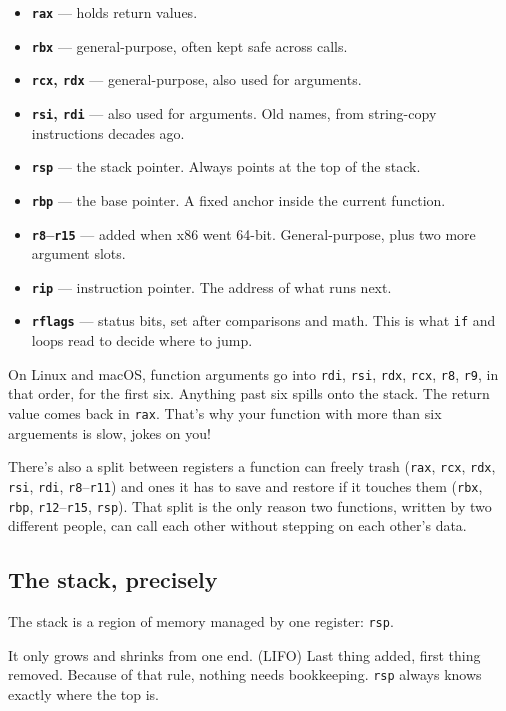 \documentclass[11pt,a4paper]{article}
\begin{document}
\begin{itemize}
\item \textbf{\texttt{rax}} --- holds return values.
\item \textbf{\texttt{rbx}} --- general-purpose, often kept safe across calls.
\item \textbf{\texttt{rcx}, \texttt{rdx}} --- general-purpose, also used for arguments.
\item \textbf{\texttt{rsi}, \texttt{rdi}} --- also used for arguments. Old names, from string-copy instructions decades ago.
\item \textbf{\texttt{rsp}} --- the stack pointer. Always points at the top of the stack.
\item \textbf{\texttt{rbp}} --- the base pointer. A fixed anchor inside the current function.
\item \textbf{\texttt{r8}--\texttt{r15}} --- added when x86 went 64-bit. General-purpose, plus two more argument slots.
\item \textbf{\texttt{rip}} --- instruction pointer. The address of what runs next.
\item \textbf{\texttt{rflags}} --- status bits, set after comparisons and math. This is what \texttt{if} and loops read to decide where to jump.
\end{itemize}

On Linux and macOS, function arguments go into \texttt{rdi}, \texttt{rsi}, \texttt{rdx}, \texttt{rcx}, \texttt{r8}, \texttt{r9}, in that order, for the first six. Anything past six spills onto the stack. The return value comes back in \texttt{rax}. That's why your function with more than six arguements is slow, jokes on you!

There's also a split between registers a function can freely trash (\texttt{rax}, \texttt{rcx}, \texttt{rdx}, \texttt{rsi}, \texttt{rdi}, \texttt{r8}--\texttt{r11}) and ones it has to save and restore if it touches them (\texttt{rbx}, \texttt{rbp}, \texttt{r12}--\texttt{r15}, \texttt{rsp}). That split is the only reason two functions, written by two different people, can call each other without stepping on each other's data.

\subsection{The stack, precisely}

The stack is a region of memory managed by one register: \texttt{rsp}.

It only grows and shrinks from one end. (LIFO) Last thing added, first thing removed. Because of that rule, nothing needs bookkeeping. \texttt{rsp} always knows exactly where the top is.
\end{document}

